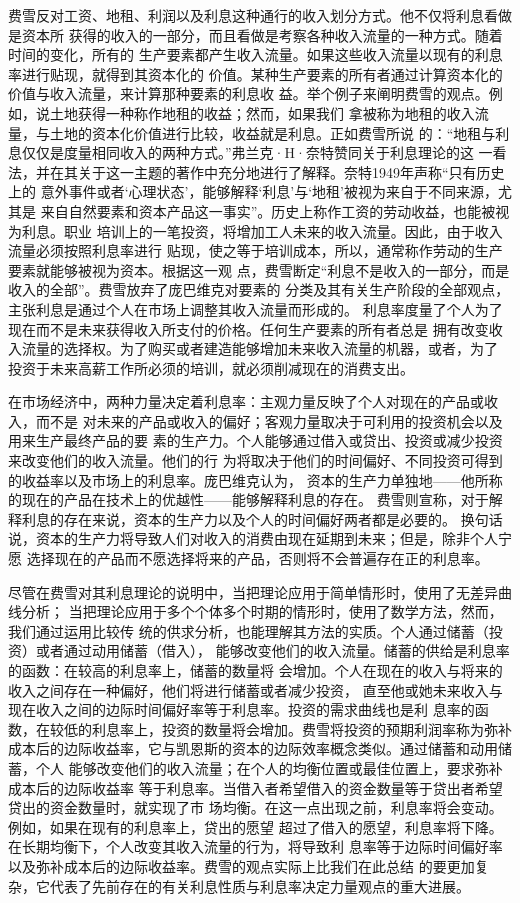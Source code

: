 费雪反对工资、地租、利润以及利息这种通行的收入划分方式。他不仅将利息看做是资本所
获得的收入的一部分，而且看做是考察各种收入流量的一种方式。随着时间的变化，所有的
生产要素都产生收入流量。如果这些收入流量以现有的利息率进行贴现，就得到其资本化的
价值。某种生产要素的所有者通过计算资本化的价值与收入流量，来计算那种要素的利息收
益。举个例子来阐明费雪的观点。例如，说土地获得一种称作地租的收益；然而，如果我们
拿被称为地租的收入流量，与土地的资本化价值进行比较，收益就是利息。正如费雪所说
的：“地租与利息仅仅是度量相同收入的两种方式。”弗兰克·H·奈特赞同关于利息理论的这
一看法，并在其关于这一主题的著作中充分地进行了解释。奈特1949年声称“只有历史上的
意外事件或者‘心理状态’，能够解释‘利息’与‘地租’被视为来自于不同来源，尤其是
来自自然要素和资本产品这一事实”。历史上称作工资的劳动收益，也能被视为利息。职业
培训上的一笔投资，将增加工人未来的收入流量。因此，由于收入流量必须按照利息率进行
贴现，使之等于培训成本，所以，通常称作劳动的生产要素就能够被视为资本。根据这一观
点，费雪断定“利息不是收入的一部分，而是收入的全部”。费雪放弃了庞巴维克对要素的
分类及其有关生产阶段的全部观点，主张利息是通过个人在市场上调整其收入流量而形成的。
利息率度量了个人为了现在而不是未来获得收入所支付的价格。任何生产要素的所有者总是
拥有改变收入流量的选择权。为了购买或者建造能够增加未来收入流量的机器，或者，为了
投资于未来高薪工作所必须的培训，就必须削减现在的消费支出。

在市场经济中，两种力量决定着利息率：主观力量反映了个人对现在的产品或收入，而不是
对未来的产品或收入的偏好；客观力量取决于可利用的投资机会以及用来生产最终产品的要
素的生产力。个人能够通过借入或贷出、投资或减少投资来改变他们的收入流量。他们的行
为将取决于他们的时间偏好、不同投资可得到的收益率以及市场上的利息率。庞巴维克认为，
资本的生产力单独地——他所称的现在的产品在技术上的优越性——能够解释利息的存在。
费雪则宣称，对于解释利息的存在来说，资本的生产力以及个人的时间偏好两者都是必要的。
换句话说，资本的生产力将导致人们对收入的消费由现在延期到未来；但是，除非个人宁愿
选择现在的产品而不愿选择将来的产品，否则将不会普遍存在正的利息率。

尽管在费雪对其利息理论的说明中，当把理论应用于简单情形时，使用了无差异曲线分析；
当把理论应用于多个个体多个时期的情形时，使用了数学方法，然而，我们通过运用比较传
统的供求分析，也能理解其方法的实质。个人通过储蓄（投资）或者通过动用储蓄（借入），
能够改变他们的收入流量。储蓄的供给是利息率的函数：在较高的利息率上，储蓄的数量将
会增加。个人在现在的收入与将来的收入之间存在一种偏好，他们将进行储蓄或者减少投资，
直至他或她未来收入与现在收入之间的边际时间偏好率等于利息率。投资的需求曲线也是利
息率的函数，在较低的利息率上，投资的数量将会增加。费雪将投资的预期利润率称为弥补
成本后的边际收益率，它与凯恩斯的资本的边际效率概念类似。通过储蓄和动用储蓄，个人
能够改变他们的收入流量；在个人的均衡位置或最佳位置上，要求弥补成本后的边际收益率
等于利息率。当借入者希望借入的资金数量等于贷出者希望贷出的资金数量时，就实现了市
场均衡。在这一点出现之前，利息率将会变动。例如，如果在现有的利息率上，贷出的愿望
超过了借入的愿望，利息率将下降。在长期均衡下，个人改变其收入流量的行为，将导致利
息率等于边际时间偏好率以及弥补成本后的边际收益率。费雪的观点实际上比我们在此总结
的要更加复杂，它代表了先前存在的有关利息性质与利息率决定力量观点的重大进展。


